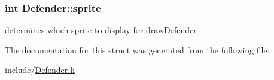 \subsubsection[{sprite}]{\setlength{\rightskip}{0pt plus 5cm}int Defender\+::sprite}\label{structDefender_a029bf2149c57ff793a93fa5b49bb9d18}
determines which sprite to display for draw\+Defender 

The documentation for this struct was generated from the following file\+:\begin{DoxyCompactItemize}
\item 
include/\hyperlink{Defender_8h}{Defender.\+h}\end{DoxyCompactItemize}
